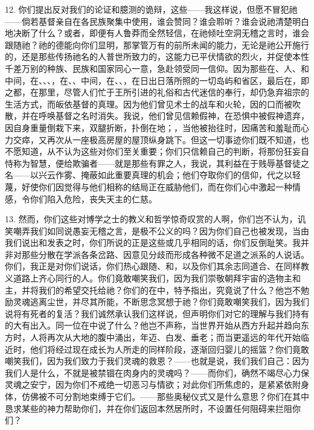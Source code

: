 12. 你们提出反对我们的论证和臆测的诡辩，这些——我这样说，但愿不冒犯祂——倘若基督亲自在各民族聚集中使用，谁会赞同？谁会聆听？谁会说祂清楚明白地决断了什么？或者，即便有人鲁莽而全然轻信，在祂倾吐空洞无稽之言时，谁会跟随祂？祂的德能向你们显明，那掌管万有的前所未闻的能力，无论是祂公开施行的，还是那些传扬祂名的人普世所致力的，这能力已平伏情欲的烈火，并促使本性千差万别的种族、民族和国家同心一意，急赴领受同一信仰。因为那些在、人、和中间，在、、、，在、、中间，在、、，在日出日落所照的一切岛屿和省区，最后在，即之都，在那里，尽管人们忙于王所引进的礼俗和古代迷信的奉行，却仍急弃祖宗的生活方式，而皈依基督的真理。因为他们曾见术士的战车和火轮，因的口而被吹散，并在呼唤基督之名时消失。我说，他们曾见信赖假神，在恐惧中被假神遗弃，因自身重量倒栽下来，双腿折断，扑倒在地；，当他被抬往时，因痛苦和羞耻而心力交瘁，又再次从一座极高房屋的屋顶纵身跳下。但这一切事迹你们既不知道，也不愿知道，从不认为这些对你们至关重要；你们只信赖自己的判断，将那份狂妄自恃称为智慧，便给欺骗者——就是那些有罪之人，我说，其利益在于贱辱基督徒之名——以兴云作雾、掩蔽如此重要真理的机会；他们夺取你们的信仰，代之以轻蔑，好使你们因觉得与他们相称的结局正在威胁他们，而在你们心中激起一种情感，令你们陷入危险，丧失天主的仁慈。\par

13. 然而，你们这些对博学之士的教义和哲学惊奇叹赏的人啊，你们岂不认为，讥笑嘲弄我们如同说愚妄无稽之言，是极不公义的吗？因为你们自己也被发现，当由我们说出和发表之时，你们所说的正是这些或几乎相同的话，你们反倒耻笑。我并非对那些分散在学派各条岔路、因意见分歧而形成各种微不足道之派系的人说话。你们，我正是对你们说话，你们热心跟随、和，以及你们其余志同道合、在同样教义道路上齐心同行的人。你们竟敢嘲笑我们，因为我们崇敬朝拜宇宙的造物主和主，并将我们的希望交托给祂？你们的在中，特予指出，究竟说了什么？他岂不勉励灵魂逃离尘世，并尽其所能，不断思念冥想于祂？你们竟敢嘲笑我们，因为我们说将有死者的复活？我们诚然承认我们这样说，但声明你们对它的理解与我们持有的大有出入。同一位在中说了什么？他岂不声称，当世界开始从西方升起并趋向东方时，人将再次从大地的腹中涌出，年迈、白发、垂老；而当更遥远的年代开始临近时，他们将经过现在成长为人所走的同样阶段，逐渐回归婴儿的摇篮？你们竟敢嘲笑我们，因为我们致力于我们灵魂的救恩？——也就是说，我们我们自己：因为我们人是什么，不就是被禁锢在肉身内的灵魂吗？——而你们，确然不竭尽心力保灵魂之安宁，因为你们不戒绝一切恶习与情欲；对此你们所焦虑的，是紧紧依附身体，仿佛被不可分割地束缚于它们。——那些奥秘仪式又是什么意思？你们在其中恳求某些的神力帮助你们，并在你们返回本然居所时，不设置任何阻碍来拦阻你们？\par

